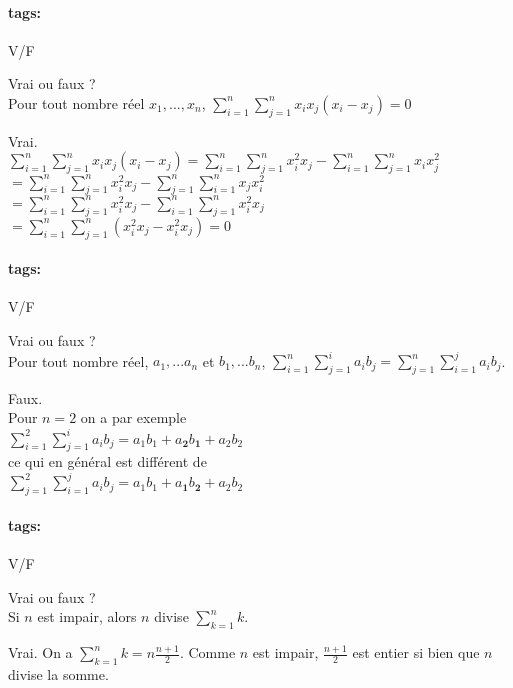 \documentclass[12pt]{article}
\newcommand*{\xfield}[1]{\begin{mdframed}\centering #1\end{mdframed}\bigskip}
\newenvironment{note}{}{}
\newcommand*{\tags}[1]{\paragraph{tags: }#1}
\begin{document}
\begin{note}
\tags{V/F}
	\xfield{Vrai ou faux ?\\
	Pour tout nombre réel $x_1,...,x_n$, $\sum\limits^{n}_{i=1} \sum\limits^{n}_{j=1} x_i x_j (x_i-x_j) = 0$}
	\xfield{Vrai.\\
	$\sum\limits^{n}_{i=1} \sum\limits^{n}_{j=1} x_i x_j (x_i-x_j) = \sum\limits^{n}_{i=1} \sum\limits^{n}_{j=1} x_i^2 x_j - \sum\limits^{n}_{i=1} \sum\limits^{n}_{j=1} x_i x_j^2 $\\
	$=\sum\limits^{n}_{i=1} \sum\limits^{n}_{j=1} x_i^2 x_j - \sum\limits^{n}_{j=1} \sum\limits^{n}_{i=1} x_j x_i^2 $\\
	$=\sum\limits^{n}_{i=1} \sum\limits^{n}_{j=1} x_i^2 x_j - \sum\limits^{n}_{i=1} \sum\limits^{n}_{j=1} x_i^2 x_j $\\
	$= \sum\limits^{n}_{i=1} \sum\limits^{n}_{j=1} (x_i^2 x_j - x_i^2 x_j) = 0$
	}
\end{note}

\begin{note}
\tags{V/F}
	\xfield{Vrai ou faux ?\\
	Pour tout nombre réel, $a_1,...a_n$ et $b_1,...b_n$, $\sum\limits^{n}_{i=1}\sum\limits^{i}_{j=1} a_i b_j = \sum\limits^{n}_{j=1}\sum\limits^{j}_{i=1}a_i b_j$.}
	\xfield{Faux.\\
	Pour $n=2$ on a par exemple\\
	$\sum\limits^{2}_{i=1}\sum\limits^{i}_{j=1} a_i b_j = a_1b_1+a_\mathbf{2}b_\mathbf{1}+a_2b_2$\\
	ce qui en général est différent de \\
	$\sum\limits^{2}_{j=1}\sum\limits^{j}_{i=1} a_i b_j = a_1b_1+a_\mathbf{1}b_\mathbf{2}+a_2b_2$}
\end{note}

\begin{note}
\tags{V/F}
	\xfield{Vrai ou faux ?\\
	Si $n$ est impair, alors $n$ divise $\sum\limits^{n}_{k=1} k$.}
	\xfield{Vrai. On a $\sum\limits^n_{k=1}k=n\frac{n+1}{2}$. Comme $n$ est impair, $\frac{n+1}{2}$ est entier si bien que $n$ divise la somme.}
\end{note}
\end{document}
